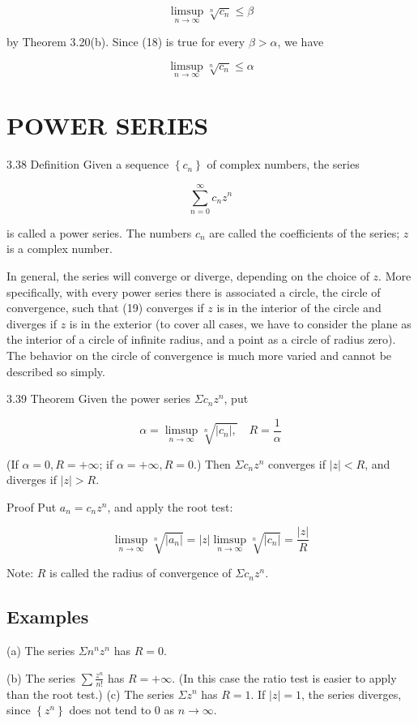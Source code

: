 \documentclass[10pt]{article}
\begin{document}
$$
\limsup _{n \rightarrow \infty} \sqrt[n]{c_{n}} \leq \beta
$$

by Theorem 3.20(b). Since (18) is true for every $\beta>\alpha$, we have

$$
\limsup _{n \rightarrow \infty} \sqrt[n]{c_{n}} \leq \alpha
$$

\section{POWER SERIES}
3.38 Definition Given a sequence $\left\{c_{n}\right\}$ of complex numbers, the series

$$
\sum_{n=0}^{\infty} c_{n} z^{n}
$$

is called a power series. The numbers $c_{n}$ are called the coefficients of the series; $z$ is a complex number.

In general, the series will converge or diverge, depending on the choice of $z$. More specifically, with every power series there is associated a circle, the circle of convergence, such that (19) converges if $z$ is in the interior of the circle and diverges if $z$ is in the exterior (to cover all cases, we have to consider the plane as the interior of a circle of infinite radius, and a point as a circle of radius zero). The behavior on the circle of convergence is much more varied and cannot be described so simply.

3.39 Theorem Given the power series $\Sigma c_{n} z^{n}$, put

$$
\alpha=\limsup _{n \rightarrow \infty} \sqrt[n]{\left|c_{n}\right|,} \quad R=\frac{1}{\alpha}
$$

(If $\alpha=0, R=+\infty$; if $\alpha=+\infty, R=0$.) Then $\Sigma c_{n} z^{n}$ converges if $|z|<R$, and diverges if $|z|>R$.

Proof Put $a_{n}=c_{n} z^{n}$, and apply the root test:

$$
\limsup _{n \rightarrow \infty} \sqrt[n]{\left|a_{n}\right|}=|z| \limsup _{n \rightarrow \infty} \sqrt[n]{\left|c_{n}\right|}=\frac{|z|}{R}
$$

Note: $R$ is called the radius of convergence of $\Sigma c_{n} z^{n}$.

\subsection{Examples}
(a) The series $\Sigma n^{n} z^{n}$ has $R=0$.

(b) The series $\sum \frac{z^{n}}{n !}$ has $R=+\infty$. (In this case the ratio test is easier to apply than the root test.)
(c) The series $\Sigma z^{n}$ has $R=1$. If $|z|=1$, the series diverges, since $\left\{z^{n}\right\}$ does not tend to 0 as $n \rightarrow \infty$.
\end{document}
